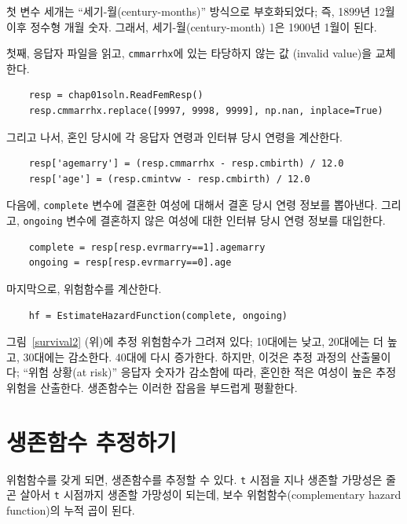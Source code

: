 첫 변수 세개는 ``세기-월(century-months)'' 방식으로 부호화되었다; 즉, 1899년 12월 이후 정수형 개월 숫자. 그래서, 세기-월(century-month) 1은 1900년 1월이 된다.

첫째, 응답자 파일을 읽고, {\tt cmmarrhx}에 있는 타당하지 않는 값 (invalid value)을 교체한다.

\begin{verbatim}
    resp = chap01soln.ReadFemResp()
    resp.cmmarrhx.replace([9997, 9998, 9999], np.nan, inplace=True)
\end{verbatim}

그리고 나서, 혼인 당시에 각 응답자 연령과 인터뷰 당시 연령을 계산한다.

\begin{verbatim}
    resp['agemarry'] = (resp.cmmarrhx - resp.cmbirth) / 12.0
    resp['age'] = (resp.cmintvw - resp.cmbirth) / 12.0
\end{verbatim}

다음에, {\tt complete} 변수에 결혼한 여성에 대해서 결혼 당시 연령 정보를 뽑아낸다. 그리고, {\tt ongoing} 변수에 결혼하지 않은 여성에 대한 인터뷰 당시 연령 정보를 대입한다.

\begin{verbatim}
    complete = resp[resp.evrmarry==1].agemarry
    ongoing = resp[resp.evrmarry==0].age
\end{verbatim}

마지막으로, 위험함수를 계산한다.

\begin{verbatim}
    hf = EstimateHazardFunction(complete, ongoing)
\end{verbatim}

그림~\ref{survival2} (위)에 추정 위험함수가 그려져 있다; 10대에는 낮고, 20대에는 더 높고, 30대에는 감소한다. 40대에 다시 증가한다. 하지만, 이것은 추정 과정의 산출물이다; ``위험 상황(at risk)'' 응답자 숫자가 감소함에 따라, 혼인한 적은 여성이 높은 추정 위험을 산출한다. 생존함수는 이러한 잡음을 부드럽게 평활한다.


\section{생존함수 추정하기}

위험함수를 갖게 되면, 생존함수를 추정할 수 있다.
{\tt t} 시점을 지나 생존할 가망성은 줄곤 살아서 {\tt t} 시점까지 생존할 가망성이 되는데, 보수 위험함수(complementary hazard function)의 누적 곱이 된다.

